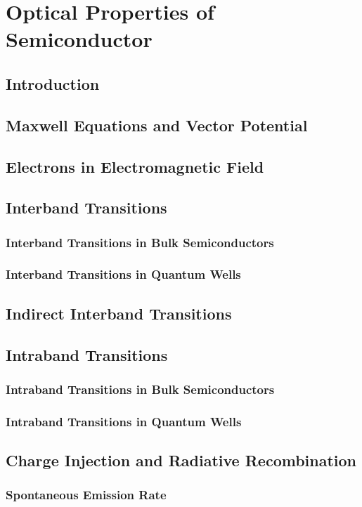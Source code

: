 \chapter{Optical Properties of Semiconductor}
\section{Introduction}
\section{Maxwell Equations and Vector Potential}
\section{Electrons in Electromagnetic Field}
\section{Interband Transitions}
\subsection{Interband Transitions in Bulk Semiconductors}
\subsection{Interband Transitions in Quantum Wells}
\section{Indirect Interband Transitions}
\section{Intraband Transitions}
\subsection{Intraband Transitions in Bulk Semiconductors}
\subsection{Intraband Transitions in Quantum Wells}
\section{Charge Injection and Radiative Recombination}
\subsection{Spontaneous Emission Rate}
